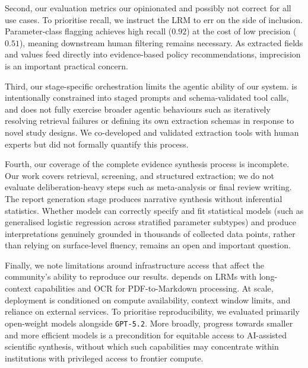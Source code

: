 Second, our evaluation metrics our opinionated and possibly not correct for all use cases. To prioritise recall, we instruct the LRM to err on the side of inclusion. Parameter-class flagging achieves high recall ($0.92$) at the cost of low precision ($0.51$), meaning downstream human filtering remains necessary. As extracted fields and values feed directly into evidence-based policy recommendations, imprecision is an important practical concern.

Third, our stage-specific orchestration limits the agentic ability of our system. \name{} is intentionally constrained into staged prompts and schema-validated tool calls, and does not fully exercise broader agentic behaviours such as iteratively resolving retrieval failures or defining its own extraction schemas in response to novel study designs. We co-developed and validated extraction tools with human experts but did not formally quantify this process.

Fourth, our coverage of the complete evidence synthesis process is incomplete. Our work covers retrieval, screening, and structured extraction; we do not evaluate deliberation-heavy steps such as meta-analysis or final review writing. The report generation stage produces narrative synthesis without inferential statistics. Whether models can correctly specify and fit statistical models (such as generalised logistic regression across stratified parameter subtypes) and produce interpretations genuinely grounded in thousands of collected data points, rather than relying on surface-level fluency, remains an open and important question.

Finally, we note limitations around infrastructure access that affect the community's ability to reproduce our results. \name{} depends on LRMs with long-context capabilities and OCR for PDF-to-Markdown processing. At scale, deployment is conditioned on compute availability, context window limits, and reliance on external services. To prioritise reproducibility, we evaluated primarily open-weight models alongside \texttt{GPT-5.2}. More broadly, progress towards smaller and more efficient models is a precondition for equitable access to AI-assisted scientific synthesis, without which such capabilities may concentrate within institutions with privileged access to frontier compute.